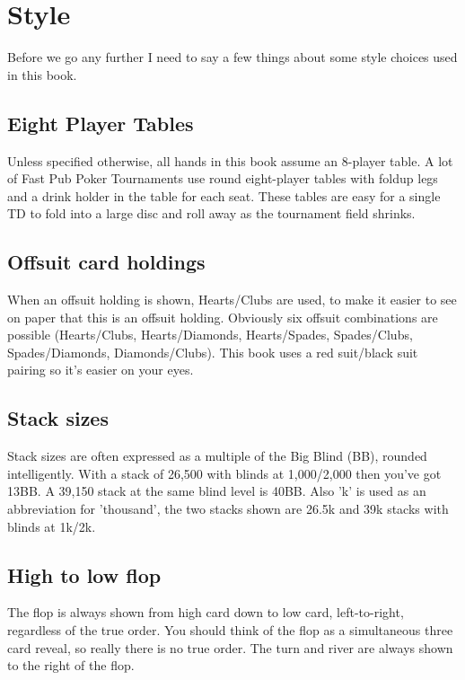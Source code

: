 \chapter{Style}


Before we go any further I need to say a few things about
some style choices used in this book.

\section*{Eight Player Tables}

Unless specified otherwise, all hands in this book assume an
8-player table. A lot of Fast Pub Poker Tournaments use
round eight-player tables with foldup legs and a drink holder
in the table for each seat. These tables are easy for a single TD
to fold into a large disc and roll away as the tournament
field shrinks.

\section*{Offsuit card holdings}

When an offsuit holding is shown, Hearts/Clubs are used, to make
it easier to see on paper that this is an offsuit holding. Obviously
six offsuit combinations are possible (Hearts/Clubs, Hearts/Diamonds,
Hearts/Spades, Spades/Clubs, Spades/Diamonds, Diamonds/Clubs).
This book uses a red suit/black suit pairing so it's easier on your eyes.

\section*{Stack sizes}

Stack sizes are often expressed as a multiple of the Big Blind (BB),
rounded intelligently. With a stack of 26,500 with blinds at 1,000/2,000
then you've got 13BB. A 39,150 stack at the same blind level is 40BB.
Also 'k' is used as an abbreviation for 'thousand', the two stacks
shown are 26.5k and 39k stacks with blinds at 1k/2k.

\section*{High to low flop}

The flop is always shown from high card down to low card, left-to-right,
regardless of the true order. You should think of the flop as a
simultaneous three card reveal, so really there is no true order. The turn
and river are always shown to the right of the flop.
